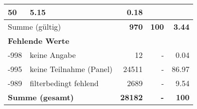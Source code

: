 \begin{longtable}{lXrrr}
       \num{50} &
       \num[round-mode=places,round-precision=2]{5.15} &
         \num[round-mode=places,round-precision=2]{0.18} \\
     \midrule
     \multicolumn{2}{l}{Summe (gültig)} &
       \textbf{\num{970}} &
     \textbf{100} &
       \textbf{\num[round-mode=places,round-precision=2]{3.44}} \\
     \multicolumn{5}{l}{\textbf{Fehlende Werte}}\\
       -998 &
       keine Angabe &
         \num{12} &
        - &
         \num[round-mode=places,round-precision=2]{0.04} \\
       -995 &
       keine Teilnahme (Panel) &
         \num{24511} &
        - &
         \num[round-mode=places,round-precision=2]{86.97} \\
       -989 &
       filterbedingt fehlend &
         \num{2689} &
        - &
         \num[round-mode=places,round-precision=2]{9.54} \\
     \midrule
     \multicolumn{2}{l}{\textbf{Summe (gesamt)}} &
          \textbf{\num{28182}} &
        \textbf{-} &
        \textbf{100} \\
     \bottomrule
     \end{longtable}
     
